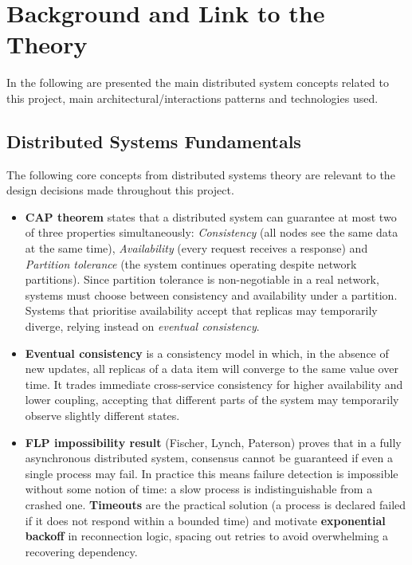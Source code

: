 \section{Background and Link to the Theory}

In the following are presented the main distributed system concepts related to this project, main architectural/interactions patterns and technologies used.

\subsection{Distributed Systems Fundamentals}

The following core concepts from distributed systems theory are relevant to the design decisions made throughout this project.

\begin{itemize}
  \item \textbf{CAP theorem} states that a distributed system can guarantee at most two of three properties simultaneously: \textit{Consistency} (all nodes see the same data at the same time), \textit{Availability} (every request receives a response) and \textit{Partition tolerance} (the system continues operating despite network partitions). Since partition tolerance is non-negotiable in a real network, systems must choose between consistency and availability under a partition. Systems that prioritise availability accept that replicas may temporarily diverge, relying instead on \textit{eventual consistency}.

  \item \textbf{Eventual consistency} is a consistency model in which, in the absence of new updates, all replicas of a data item will converge to the same value over time. It trades immediate cross-service consistency for higher availability and lower coupling, accepting that different parts of the system may temporarily observe slightly different states.

  \item \textbf{FLP impossibility result} (Fischer, Lynch, Paterson) proves that in a fully asynchronous distributed system, consensus cannot be guaranteed if even a single process may fail. In practice this means failure detection is impossible without some notion of time: a slow process is indistinguishable from a crashed one. \textbf{Timeouts} are the practical solution (a process is declared failed if it does not respond within a bounded time) and motivate \textbf{exponential backoff} in reconnection logic, spacing out retries to avoid overwhelming a recovering dependency.


\end{itemize}
